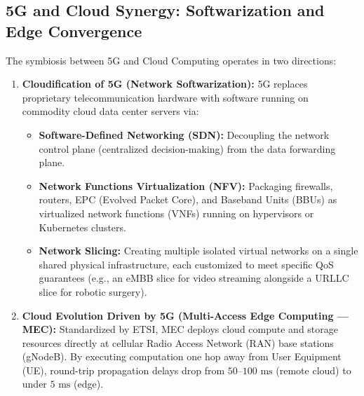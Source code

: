 \subsection{5G and Cloud Synergy: Softwarization and Edge Convergence}
The symbiosis between 5G and Cloud Computing operates in two directions:
\begin{enumerate}[leftmargin=*]
  \item \textbf{Cloudification of 5G (Network Softwarization):} 5G replaces proprietary telecommunication hardware with software running on commodity cloud data center servers via:
    \begin{itemize}
      \item \textbf{Software-Defined Networking (SDN):} Decoupling the network control plane (centralized decision-making) from the data forwarding plane.
      \item \textbf{Network Functions Virtualization (NFV):} Packaging firewalls, routers, EPC (Evolved Packet Core), and Baseband Units (BBUs) as virtualized network functions (VNFs) running on hypervisors or Kubernetes clusters.
      \item \textbf{Network Slicing:} Creating multiple isolated virtual networks on a single shared physical infrastructure, each customized to meet specific QoS guarantees (e.g., an eMBB slice for video streaming alongside a URLLC slice for robotic surgery).
    \end{itemize}
  \item \textbf{Cloud Evolution Driven by 5G (Multi-Access Edge Computing --- MEC):} Standardized by ETSI, MEC deploys cloud compute and storage resources directly at cellular Radio Access Network (RAN) base stations (gNodeB). By executing computation one hop away from User Equipment (UE), round-trip propagation delays drop from $50\text{--}100\text{ ms}$ (remote cloud) to under $5\text{ ms}$ (edge).
\end{enumerate}

